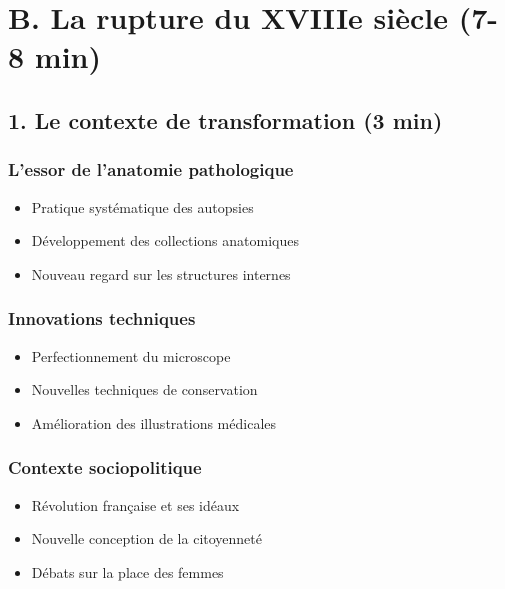 \documentclass[
  letterpaper,
  DIV=11,
  numbers=noendperiod]{scrreprt}
\providecommand{\tightlist}{%
  \setlength{\itemsep}{0pt}\setlength{\parskip}{0pt}}\usepackage{longtable,booktabs,array}
\begin{document}
\subsection{}\label{section-5}


\chapter{B. La rupture du XVIIIe siècle (7-8
min)}\label{b.-la-rupture-du-xviiie-siuxe8cle-7-8-min}

\section{1. Le contexte de transformation (3
min)}\label{le-contexte-de-transformation-3-min}

\subsection{L'essor de l'anatomie
pathologique}\label{lessor-de-lanatomie-pathologique}

\begin{itemize}
\tightlist
\item
  Pratique systématique des autopsies
\item
  Développement des collections anatomiques
\item
  Nouveau regard sur les structures internes
\end{itemize}

\subsection{Innovations techniques}\label{innovations-techniques}

\begin{itemize}
\tightlist
\item
  Perfectionnement du microscope
\item
  Nouvelles techniques de conservation
\item
  Amélioration des illustrations médicales
\end{itemize}

\subsection{Contexte sociopolitique}\label{contexte-sociopolitique}

\begin{itemize}
\tightlist
\item
  Révolution française et ses idéaux
\item
  Nouvelle conception de la citoyenneté
\item
  Débats sur la place des femmes
\end{itemize}
\end{document}
